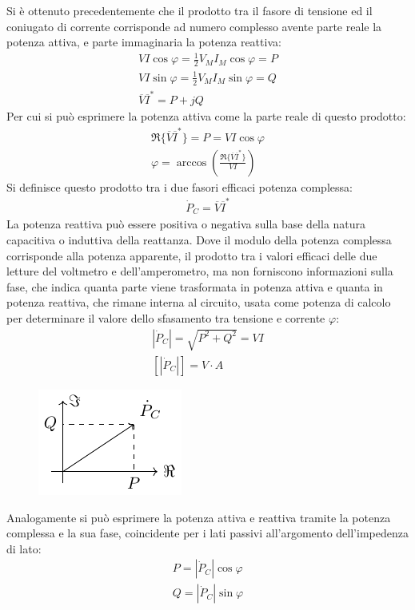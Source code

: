 \documentclass{article}
\numberwithin{equation}{subsection}
\begin{document}
Si è ottenuto precedentemente che il prodotto tra il fasore di tensione ed il coniugato di corrente corrisponde ad numero complesso avente parte reale la potenza attiva, e 
parte immaginaria la potenza reattiva:
\begin{gather*}
    VI\cos\varphi=\displaystyle\frac{1}{2}V_MI_M\cos\varphi=P\\
    VI\sin\varphi=\displaystyle\frac{1}{2}V_MI_M\sin\varphi=Q\\
    \overline{V}\overline{I}^*=P+jQ
\end{gather*}
Per cui si può esprimere la potenza attiva come la parte reale di questo prodotto:
\begin{gather*}
    \Re\{\overline{V}\overline{I}^*\}=P=VI\cos\varphi\\
    \varphi=\arccos\left(\displaystyle\frac{\Re\{\overline{V}\overline{I}^*\}}{VI}\right)
\end{gather*}
Si definisce questo prodotto tra i due fasori efficaci potenza complessa:
\begin{gather*}
    \dot P_C=\overline{V}\overline{I}^*
\end{gather*}
La potenza reattiva può essere positiva o negativa sulla base della natura capacitiva o induttiva della reattanza. 
Dove il modulo della potenza complessa corrisponde alla potenza apparente, il prodotto tra i valori efficaci delle due letture del voltmetro e dell'amperometro, ma non forniscono 
informazioni sulla fase, che indica quanta parte viene trasformata in potenza attiva e quanta in potenza reattiva, che rimane interna al circuito, usata come potenza di 
calcolo per determinare il valore dello sfasamento tra tensione e corrente $\varphi$: 
\begin{gather*}
    |\dot P_C|=\displaystyle\sqrt{P^2+Q^2}=VI\\
    \left[|\dot P_C|\right]=V\cdot A
\end{gather*}
\begin{figure}[H]%
    \centering
    \includegraphics{potenza-complessa.pdf}%
    \label{fig:potenza-complessa}
\end{figure}
Analogamente si può esprimere la potenza attiva e reattiva tramite la potenza complessa e la sua fase, coincidente per i lati passivi all'argomento dell'impedenza di lato:
\begin{gather}
    P=|\dot P_C|\cos\varphi\\
    Q=|\dot P_C|\sin\varphi
\end{gather}
\end{document}
